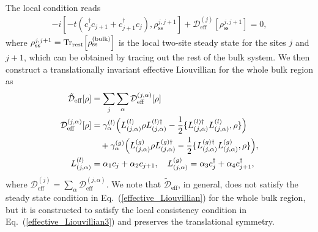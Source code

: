 \documentclass[a4paper, amsfonts, amssymb, amsmath, reprint, showkeys, nofootinbib, twoside,superscriptaddress, prb]{revtex4-2}
\newcommand{\m}[1]{\mathcal{#1}}
\newcommand{\mr}[1]{\mathrm{#1}}
\begin{document}
The local condition reads
\begin{align}
    -i[-t(c_j^{\dagger} c_{j+1} + c_{j+1}^{\dagger} c_j), \rho^{j, j+1}_{\mr{ss}}] + \m{D}^{(j)}_{\mr{eff}}[\rho^{j, j+1}_{\mr{ss}}] = 0,\label{effective_Liouvillian3}
\end{align}
where $\rho^{j, j+1}_{\mr{ss}} = \mr{Tr_{rest}}\Bigl[ \rho^{(\mr{bulk})}_{\mr{ss}} \Bigr]$ is the local two-site steady state for the sites $j$ and $j+1$, which can be obtained by tracing out the rest of the bulk system. 
We then construct a translationally invariant effective Liouvillian for the whole bulk region as
\begin{align}
    \tilde{\m{D}}_{\mr{eff}}[\rho] &= \sum_j \sum_{\alpha}\m{D}^{(j, \alpha)}_{\mr{eff}}[\rho]\nonumber\\
    \m{D}^{(j, \alpha)}_{\mr{eff}}[\rho] &= \gamma^{(l)}_{\alpha} \Bigl(L^{(l)}_{(j,\alpha)}\rho L^{(l)\dagger}_{(j,\alpha)} - \frac{1}{2}\{L^{(l)\dagger}_{(j,\alpha)} L^{(l)}_{(j,\alpha)}, \rho\}\Bigr)\nonumber\\
    & \quad + \gamma^{(g)}_{\alpha} \Bigl(L^{(g)}_{(j,\alpha)}\rho L^{(g)\dagger}_{(j,\alpha)} - \frac{1}{2}\{L^{(g)\dagger}_{(j,\alpha)} L^{(g)}_{(j,\alpha)}, \rho\}\Bigr),\label{effective_Liouvillian2}\\
    L^{(l)}_{(j,\alpha)} &= \alpha_1 c_j + \alpha_2 c_{j+1},\quad L^{(g)}_{(j,\alpha)} = \alpha_3 c_j^{\dagger} + \alpha_4 c_{j+1}^{\dagger},\label{jump_gain}
\end{align}
where $\m{D}^{(j)}_{\mr{eff}} = \sum_\alpha\m{D}^{(j,\alpha)}_{\mr{eff}}$. We note that $\tilde{\m{D}}_{\mr{eff}}$, in general, does not satisfy the steady state condition in Eq.~(\ref{effective_Liouvillian}) for the whole bulk region, but it is constructed to satisfy the local consistency condition in Eq.~(\ref{effective_Liouvillian3}) and preserves the translational symmetry.
\end{document}
